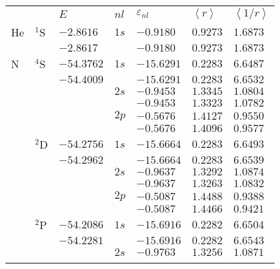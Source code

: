 {{{{\begin{table}
\begin{center}
\begin{tabularx}{\textwidth}{
>{\centering\arraybackslash}p{}
>{\centering\arraybackslash}p{}
>{\centering\arraybackslash}p{}
>{\centering\arraybackslash}p{}
>{\centering\arraybackslash}p{}
>{\centering\arraybackslash}p{}
>{\centering\arraybackslash}p{}}
\rowcolor{mydarkgray} 
   & & $E$ & $nl$ & $\varepsilon_{nl}$ & $\left<r\right>$ & $\left<1/r\right>$ \\
He & $^1$S & $-2.8616$   & $1s$ & $-0.9180$  & $0.9273$ & $1.6873$ \\\rowcolor{mygray} 
   &       & $-2.8617$   &      & $-0.9180$  & $0.9273$ & $1.6873$ \\
N  & $^4$S & $-54.3762$  & $1s$ & $-15.6291$ & $0.2283$ & $6.6487$ \\\rowcolor{mygray} 
   &       & $-54.4009$  &      & $-15.6291$ & $0.2283$ & $6.6532$ \\
   &       &             & $2s$ & $-0.9453$  & $1.3345$ & $1.0804$ \\\rowcolor{mygray} 
   &       &             &      & $-0.9453$  & $1.3323$ & $1.0782$ \\
   &       &             & $2p$ & $-0.5676$  & $1.4127$ & $0.9550$ \\\rowcolor{mygray} 
   &       &             &      & $-0.5676$  & $1.4096$ & $0.9577$ \\
   & $^2$D & $-54.2756$  & $1s$ & $-15.6664$ & $0.2283$ & $6.6493$ \\\rowcolor{mygray} 
   &       & $-54.2962$  &      & $-15.6664$ & $0.2283$ & $6.6539$ \\
   &       &             & $2s$ & $-0.9637$  & $1.3292$ & $1.0874$ \\\rowcolor{mygray} 
   &       &             &      & $-0.9637$  & $1.3263$ & $1.0832$ \\
   &       &             & $2p$ & $-0.5087$  & $1.4488$ & $0.9388$ \\\rowcolor{mygray} 
   &       &             &      & $-0.5087$  & $1.4466$ & $0.9421$ \\
   & $^2$P & $-54.2086$  & $1s$ & $-15.6916$ & $0.2282$ & $6.6504$ \\\rowcolor{mygray} 
   &       & $-54.2281$  &      & $-15.6916$ & $0.2282$ & $6.6543$ \\
   &       &             & $2s$ & $-0.9763$  & $1.3256$ & $1.0871$ \\\rowcolor{mygray} 

\end{tabularx}
\end{center}
\end{table}}}}}
